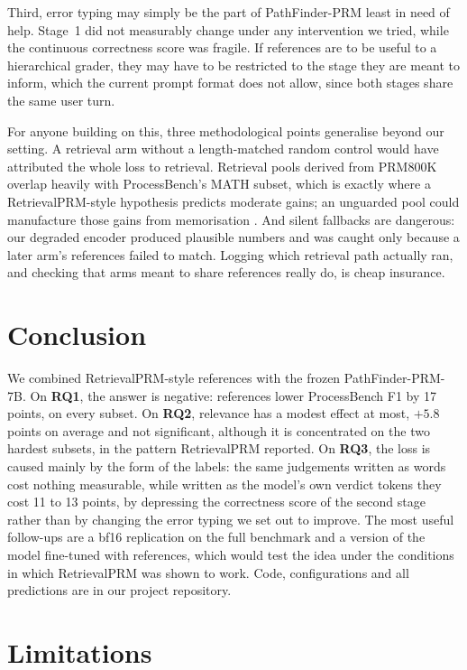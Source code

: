 \documentclass[11pt]{article}
\begin{document}
Third, error typing may simply be the part of PathFinder-PRM least in need of help. Stage~1 did
not measurably change under any intervention we tried, while the continuous correctness score
was fragile. If references are to be useful to a hierarchical grader, they may have to be
restricted to the stage they are meant to inform, which the current prompt format does not
allow, since both stages share the same user turn.

For anyone building on this, three methodological points generalise beyond our setting. A
retrieval arm without a length-matched random control would have attributed the whole loss to
retrieval. Retrieval pools derived from PRM800K overlap heavily with ProcessBench's MATH subset,
which is exactly where a RetrievalPRM-style hypothesis predicts moderate gains; an unguarded pool
could manufacture those gains from memorisation \citep{sainz2023contamination}. And silent
fallbacks are dangerous: our degraded encoder produced plausible numbers and was caught only
because a later arm's references failed to match. Logging which retrieval path actually ran, and
checking that arms meant to share references really do, is cheap insurance.

\section{Conclusion}

We combined RetrievalPRM-style references with the frozen PathFinder-PRM-7B. On \textbf{RQ1},
the answer is negative: references lower ProcessBench F1 by 17 points, on every subset. On
\textbf{RQ2}, relevance has a modest effect at most, $+5.8$ points on average and not
significant, although it is concentrated on the two hardest subsets, in the pattern RetrievalPRM
reported. On \textbf{RQ3}, the loss is caused mainly by the form of the labels: the same
judgements written as words cost nothing measurable, while written as the model's own verdict
tokens they cost 11 to 13 points, by depressing the correctness score of the second stage rather
than by changing the error typing we set out to improve. The most useful follow-ups are a bf16
replication on the full benchmark and a version of the model fine-tuned with references, which
would test the idea under the conditions in which RetrievalPRM was shown to work. Code,
configurations and all predictions are in our project repository.

\section*{Limitations}
\end{document}
